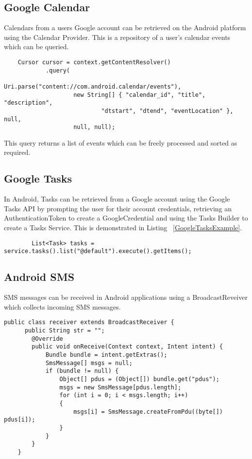 \subsection{Google Calendar}
Calendars from a users Google account can be retrieved on the Android platform using the Calendar Provider. This is a repository of a user's calendar events which can be queried.

\lstset{language=Java, caption=Calendar Provider example }
\begin{lstlisting}
    Cursor cursor = context.getContentResolver()
            .query(
                    Uri.parse("content://com.android.calendar/events"),
                    new String[] { "calendar_id", "title", "description",
                            "dtstart", "dtend", "eventLocation" }, null,
                    null, null);
\end{lstlisting}

This query returns a list of events which can be freely processed and sorted as required. 
\subsection{Google Tasks}
In Android, Tasks can be retrieved from a Google account using the Google Tasks API by prompting the user for their account credentials, retrieving an AuthenticationToken to create a GoogleCredential and using the Tasks Builder to create a Tasks Service. This is demonstrated in Listing ~\ref{GoogleTasksExample}.

\lstset{language=Java, caption=Google Tasks example, label=GoogleTasksExample}
\begin{lstlisting}
    	List<Task> tasks = service.tasks().list("@default").execute().getItems();
\end{lstlisting}

\subsection{Android SMS}
SMS messages can be received in Android applications using a BroadcastReveiver which collects incoming SMS messages.

\lstset{language=Java, caption=Android SMS example, label=AndroidSMSExample}
\begin{lstlisting}
public class receiver extends BroadcastReceiver {
      public String str = "";
        @Override
        public void onReceive(Context context, Intent intent) {
            Bundle bundle = intent.getExtras();
            SmsMessage[] msgs = null;
            if (bundle != null) {
                Object[] pdus = (Object[]) bundle.get("pdus");
                msgs = new SmsMessage[pdus.length];
                for (int i = 0; i < msgs.length; i++) 
                {
                    msgs[i] = SmsMessage.createFromPdu((byte[]) pdus[i]);
                }
            }
        }
    }
\end{lstlisting}

